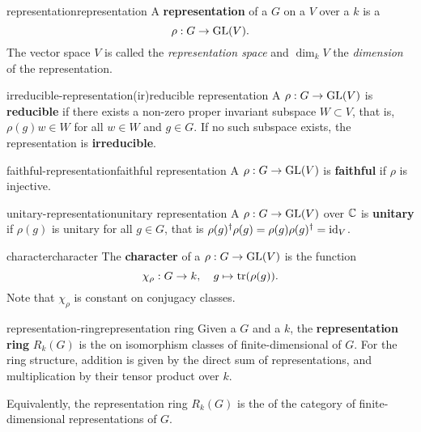 \begin{topic}{representation}{representation}
    A \textbf{representation} of a  $G$ on a  $V$ over a  $k$ is a 
    \[ \rho : G \to \textup{GL}(V) . \]
    The vector space $V$ is called the \textit{representation space} and $\dim_k V$ the \textit{dimension} of the representation.
\end{topic}

\begin{topic}{irreducible-representation}{(ir)reducible representation}
    A  $\rho : G \to \textup{GL}(V)$ is \textbf{reducible} if there exists a non-zero proper invariant subspace $W \subset V$, that is, $\rho(g) w \in W$ for all $w \in W$ and $g \in G$. If no such subspace exists, the representation is \textbf{irreducible}. %
\end{topic}

\begin{topic}{faithful-representation}{faithful representation}
    A  $\rho : G \to \textup{GL}(V)$ is \textbf{faithful} if $\rho$ is injective.
\end{topic}

\begin{topic}{unitary-representation}{unitary representation}
    A  $\rho : G \to \textup{GL}(V)$ over $\mathbb{C}$ is \textbf{unitary} if $\rho(g)$ is unitary for all $g \in G$, that is $\rho(g)^\dagger \rho(g) = \rho(g) \rho(g)^\dagger = \text{id}_V$.
\end{topic}

\begin{topic}{character}{character}
    The \textbf{character} of a  $\rho : G \to \textup{GL}(V)$ is the function
    \[ \chi_\rho : G \to k, \quad g \mapsto \textup{tr}(\rho(g)) . \]
    Note that $\chi_\rho$ is constant on conjugacy classes.
\end{topic}

\begin{topic}{representation-ring}{representation ring}
    Given a  $G$ and a  $k$, the \textbf{representation ring} $R_k(G)$ is the  on isomorphism classes of finite-dimensional  of $G$. For the ring structure, addition is given by the direct sum of representations, and multiplication by their tensor product over $k$.
    
    Equivalently, the representation ring $R_k(G)$ is the  of the category of finite-dimensional representations of $G$.
\end{topic}

